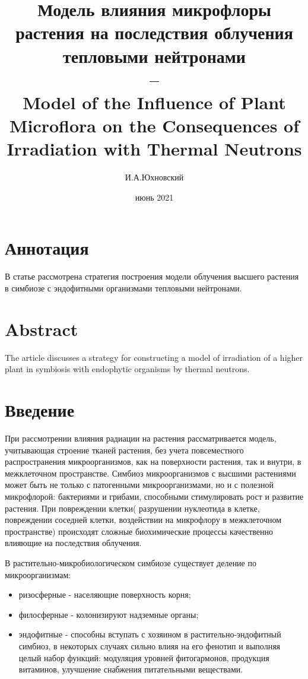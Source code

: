 \documentclass[11pt]{article}
\title{\textbf{Модель влияния микрофлоры растения на последствия облучения тепловыми нейтронами \\ -- \\ 
		Model of the Influence of Plant Microflora on the Consequences of Irradiation with Thermal Neutrons}}
\author{И.А.Юхновский}
\date{июнь 2021}
\begin{document}
	
	\maketitle
	\thispagestyle{empty}
	\section*{Аннотация}
	 В статье рассмотрена стратегия построения модели облучения высшего растения в симбиозе с эндофитными организмами тепловыми нейтронами.
	
	\section*{Abstract}
	The article discusses a strategy for constructing a model of irradiation of a higher plant in symbiosis with endophytic organisms by thermal neutrons.
	
	\tableofcontents{}
	
	\section{Введение}
	При рассмотрении влияния радиации на растения рассматривается модель, учитывающая строение тканей растения, без учета повсеместного распространения микроорганизмов, как на поверхности растения, так и внутри, в межклеточном пространстве. Симбиоз микроорганизмов с высшими растениями может быть не только с патогенными микроорганизмами, но и с полезной микрофлорой: бактериями и грибами, способными стимулировать рост и развитие растения. При повреждении клетки( разрушении нуклеотида в клетке, повреждении соседней клетки, воздействии на микрофлору в межклеточном пространстве) происходят сложные биохимические процессы качественно влияющие на последствия облучения.
	 
	В растительно-микробиологическом симбиозе существует деление по микроорганизмам:
		\begin{itemize} 
		\item ризосферные - населяющие поверхность корня;
		\item филосферные - колонизируют надземные органы;
		\item эндофитные - способны вступать с хозяином в  растительно-эндофитный симбиоз, в некоторых случаях сильно влияя на его фенотип и выполняя целый набор функций:  модуляция уровней фитогармонов, продукция витаминов, улучшение снабжения питательными веществами.
	\end{itemize} 
\end{document}
